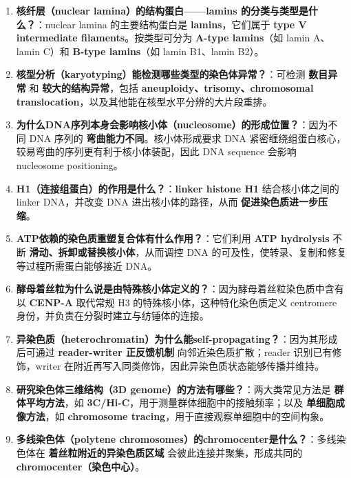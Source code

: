 \documentclass[12pt,fontset=none]{ctexart}
\begin{document}
\begin{enumerate}
\item \textbf{核纤层（nuclear lamina）的结构蛋白——lamins 的分类与类型是什么？}：nuclear lamina 的主要结构蛋白是 \textbf{lamins}，它们属于 \textbf{type V intermediate filaments}。按类型可分为 \textbf{A-type lamins}（如 lamin A、lamin C）和 \textbf{B-type lamins}（如 lamin B1、lamin B2）。

\item \textbf{核型分析（karyotyping）能检测哪些类型的染色体异常？}：可检测 \textbf{数目异常} 和 \textbf{较大的结构异常}，包括 \textbf{aneuploidy、trisomy、chromosomal translocation}，以及其他能在核型水平分辨的大片段重排。

\item \textbf{为什么DNA序列本身会影响核小体（nucleosome）的形成位置？}：因为不同 DNA 序列的 \textbf{弯曲能力不同}。核小体形成要求 DNA 紧密缠绕组蛋白核心，较易弯曲的序列更有利于核小体装配，因此 DNA sequence 会影响 nucleosome positioning。

\item \textbf{H1（连接组蛋白）的作用是什么？}：\textbf{linker histone H1} 结合核小体之间的 linker DNA，并改变 DNA 进出核小体的路径，从而 \textbf{促进染色质进一步压缩}。

\item \textbf{ATP依赖的染色质重塑复合体有什么作用？}：它们利用 \textbf{ATP hydrolysis} 不断 \textbf{滑动、拆卸或替换核小体}，从而调控 DNA 的可及性，使转录、复制和修复等过程所需蛋白能够接近 DNA。

\item \textbf{酵母着丝粒为什么说是由特殊核小体定义的？}：因为酵母着丝粒染色质中含有以 \textbf{CENP-A} 取代常规 H3 的特殊核小体，这种特化染色质定义 centromere 身份，并负责在分裂时建立与纺锤体的连接。

\item \textbf{异染色质（heterochromatin）为什么能self-propagating？}：因为其形成后可通过 \textbf{reader-writer 正反馈机制} 向邻近染色质扩散；reader 识别已有修饰，writer 在附近再写入同类修饰，因此异染色质状态能够传播并维持。

\item \textbf{研究染色体三维结构（3D genome）的方法有哪些？}：两大类常见方法是 \textbf{群体平均方法}，如 \textbf{3C/Hi-C}，用于测量群体细胞中的接触频率；以及 \textbf{单细胞成像方法}，如 \textbf{chromosome tracing}，用于直接观察单细胞中的空间构象。

\item \textbf{多线染色体（polytene chromosomes）的chromocenter是什么？}：多线染色体在 \textbf{着丝粒附近的异染色质区域} 会彼此连接并聚集，形成共同的 \textbf{chromocenter（染色中心）}。


\end{enumerate}
\end{document}
